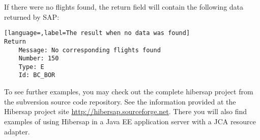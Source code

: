 If there were no flights found, the return field will contain the following data returned by SAP:

\begin{lstlisting}[language=,label=The result when no data was found]
Return
	Message: No corresponding flights found
	Number: 150
	Type: E
	Id: BC_BOR
\end{lstlisting}

To see further examples, you may check out the complete hibersap project from the subversion source code repository. See the information provided at the Hibersap project site \url{http://hibersap.sourceforge.net}. There you will also find examples of using Hibersap in a Java EE application server with a JCA resource adapter. 

